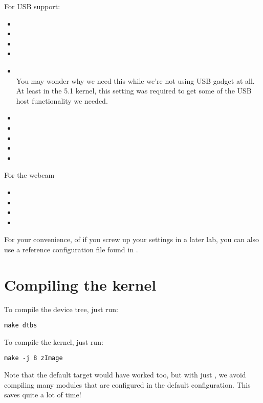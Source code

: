For USB support:
\begin{itemize}
\item {}
\item {}
\item {}
\item {}
\item {}\\
      You may wonder why we need this while we're not using USB gadget
      at all. At least in the 5.1 kernel, this setting was required to get some
      of the USB host functionality we needed.
\item {}
\item {}
\item {}
\item {}
\item {}
\end{itemize}

For the webcam
\begin{itemize}
\item {} 
\item {}
\item {}
\item {}
\end{itemize}

For your convenience, of if you screw up your settings in a later lab,
you can also use a reference configuration file found in
.

\section{Compiling the kernel}

To compile the device tree, just run:
\begin{verbatim}
make dtbs
\end{verbatim}

To compile the kernel, just run:
\begin{verbatim}
make -j 8 zImage
\end{verbatim}

Note that the default  target would have worked too, but with
just , we avoid compiling many modules that are configured
in the default configuration. This saves quite a lot of time!

